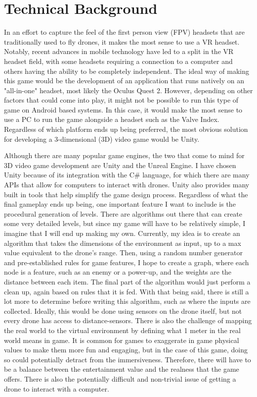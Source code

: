 \documentclass[10pt,twocolumn]{article}
\begin{document}
\section{Technical Background}
In an effort to capture the feel of the first person view (FPV) headsets that are traditionally used to fly drones, it makes the most sense to use a VR headset. Notably, recent advances in mobile technology have led to a split in the VR headset field, with some headsets requiring a connection to a computer and others having the ability to be completely independent. The ideal way of making this game would be the development of an application that runs natively on an "all-in-one" headset, most likely the Oculus Quest 2. However, depending on other factors that could come into play, it might not be possible to run this type of game on Android based systems. In this case, it would make the most sense to use a PC to run the game alongside a headset such as the Valve Index. Regardless of which platform ends up being preferred, the most obvious solution for developing a 3-dimensional (3D) video game would be Unity.

Although there are many popular game engines, the two that come to mind for 3D video game development are Unity and the Unreal Engine. I have chosen Unity because of its integration with the C\# language, for which there are many APIs that allow for computers to interact with drones. Unity also provides many built in tools that help simplify the game design process. Regardless of what the final gameplay ends up being, one important feature I want to include is the procedural generation of levels. There are algorithms out there that can create some very detailed levels, but since my game will have to be relatively simple, I imagine that I will end up making my own. Currently, my idea is to create an algorithm that takes the dimensions of the environment as input, up to a max value equivalent to the drone's range. Then, using a random number generator and pre-established rules for game features, I hope to create a graph, where each node is a feature, such as an enemy or a power-up, and the weights are the distance between each item. The final part of the algorithm would just perform a clean up, again based on rules that it is fed. With that being said, there is still a lot more to determine before writing this algorithm, such as where the inputs are collected. Ideally, this would be done using sensors on the drone itself, but not every drone has access to distance-sensors. There is also the challenge of mapping the real world to the virtual environment by defining what 1 meter in the real world means in game. It is common for games to exaggerate in game physical values to make them more fun and engaging, but in the case of this game, doing so could potentially detract from the immersiveness. Therefore, there will have to be a balance between the entertainment value and the realness that the game offers. There is also the potentially difficult and non-trivial issue of getting a drone to interact with a computer.
\end{document}
